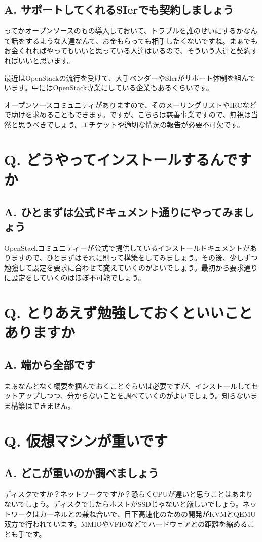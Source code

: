 \documentclass[9pt,b5paper,tombo,openany]{jsbook}
\begin{document}
\subsection*{A. サポートしてくれるSIerでも契約しましょう}
ってかオープンソースのもの導入しておいて、トラブルを誰のせいにするかなんて話をするような人達なんて、お金もらっても相手したくないですね。まぁでもお金くれればやってもいいと思っている人達はいるので、そういう人達と契約すればいいと思います。

最近はOpenStackの流行を受けて、大手ベンダーやSIerがサポート体制を組んでいます。中にはOpenStack専業にしている企業もあるくらいです。

オープンソースコミュニティがありますので、そのメーリングリストやIRCなどで助けを求めることもできます。ですが、こちらは慈善事業ですので、無視は当然と思うべきでしょう。エチケットや適切な情況の報告が必要不可欠です。
\section*{Q. どうやってインストールするんですか}
\subsection*{A. ひとまずは公式ドキュメント通りにやってみましょう}
OpenStackコミュニティーが公式で提供しているインストールドキュメントがありますので、ひとまずはそれに則って構築をしてみましょう。その後、少しずつ勉強して設定を要求に合わせて変えていくのがよいでしょう。最初から要求通りに設定をしていくのはほぼ不可能でしょう。

\section*{Q. とりあえず勉強しておくといいことありますか}
\subsection*{A. 端から全部です}
まぁなんとなく概要を掴んでおくことぐらいは必要ですが、インストールしてセットアップしつつ、分からないことを調べていくのがよいでしょう。知らないまま構築はできません。

\section*{Q. 仮想マシンが重いです}
\subsection*{A. どこが重いのか調べましょう}
ディスクですか？ネットワークですか？恐らくCPUが遅いと思うことはあまりないでしょう。ディスクでしたらホストがSSDじゃないと厳しいでしょう。ネットワークはカーネルとの兼ね合いで、目下高速化のための開発がKVMとQEMU双方で行われています。MMIOやVFIOなどでハードウェアとの距離を縮めることも手です。
\end{document}
